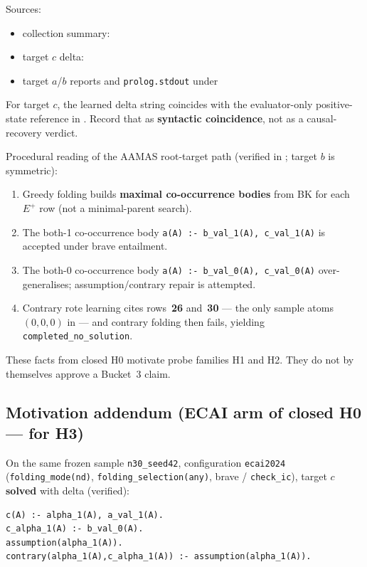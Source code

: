 \documentclass[11pt]{article}
\begin{document}
Sources:
\begin{itemize}
  \item collection summary:
  \item target \(c\) delta: 
  \item target \(a\)/\(b\) reports and \texttt{prolog.stdout} under
\end{itemize}

For target \(c\), the learned delta string coincides with the evaluator-only
positive-state reference in
.
Record that as \textbf{syntactic coincidence}, not as a causal-recovery verdict.

Procedural reading of the AAMAS root-target path (verified in
; target \(b\) is
symmetric):
\begin{enumerate}
  \item Greedy folding builds \textbf{maximal co-occurrence bodies} from BK for
    each \(E^+\) row (not a minimal-parent search).
  \item The both-1 co-occurrence body
    \texttt{a(A) :- b\_val\_1(A), c\_val\_1(A)} is accepted under brave
    entailment.
  \item The both-0 co-occurrence body
    \texttt{a(A) :- b\_val\_0(A), c\_val\_0(A)} over-generalises;
    assumption/contrary repair is attempted.
  \item Contrary rote learning cites rows~\textbf{26} and~\textbf{30} --- the
    only sample atoms \((0,0,0)\) in  --- and
    contrary folding then fails, yielding \texttt{completed\_no\_solution}.
\end{enumerate}

These facts from closed H0 motivate probe families H1 and H2. They do not by
themselves approve a Bucket~3 claim.

\subsection{Motivation addendum (ECAI arm of closed H0 --- for H3)}

{\raggedright
On the same frozen sample \texttt{n30\_seed42}, configuration \texttt{ecai2024}
(\texttt{folding\_mode(nd)}, \texttt{folding\_selection(any)}, brave /
\texttt{check\_ic}), target \(c\) \textbf{solved} with delta (verified):
\par}
\begin{verbatim}
c(A) :- alpha_1(A), a_val_1(A).
c_alpha_1(A) :- b_val_0(A).
assumption(alpha_1(A)).
contrary(alpha_1(A),c_alpha_1(A)) :- assumption(alpha_1(A)).
\end{verbatim}
\end{document}

